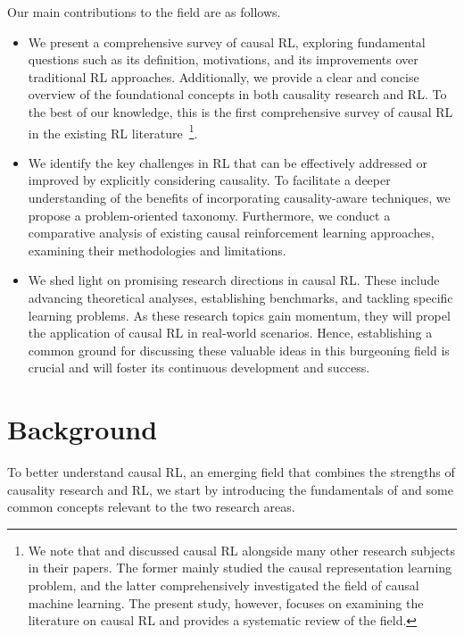 \documentclass[10pt]{article} %
\theoremstyle{definition}
\begin{document}
Our main contributions to the field are as follows.
\begin{itemize}
    \item We present a comprehensive survey of causal RL, exploring fundamental questions such as its definition, motivations, and its improvements over traditional RL approaches. Additionally, we provide a clear and concise overview of the foundational concepts in both causality research and RL. To the best of our knowledge, this is the first comprehensive survey of causal RL in the existing RL literature~\footnote{We note that \citet{scholkopfCausalRepresentationLearning2021a} and \citet{kaddourCausalMachineLearning2022b} discussed causal RL alongside many other research subjects in their papers. The former mainly studied the causal representation learning problem, and the latter comprehensively investigated the field of causal machine learning. The present study, however, focuses on examining the literature on causal RL and provides a systematic review of the field.}.
    \item We identify the key challenges in RL that can be effectively addressed or improved by explicitly considering causality. To facilitate a deeper understanding of the benefits of incorporating causality-aware techniques, we propose a problem-oriented taxonomy. Furthermore, we conduct a comparative analysis of existing causal reinforcement learning approaches, examining their methodologies and limitations.
    \item We shed light on promising research directions in causal RL. These include advancing theoretical analyses, establishing benchmarks, and tackling specific learning problems. As these research topics gain momentum, they will propel the application of causal RL in real-world scenarios. Hence, establishing a common ground for discussing these valuable ideas in this burgeoning field is crucial and will foster its continuous development and success.
\end{itemize}

%
%
\section{Background}
\label{sec:background}
To better understand causal RL, an emerging field that combines the strengths of causality research and RL, we start by introducing the fundamentals of and some common concepts relevant to the two research areas.
\end{document}
